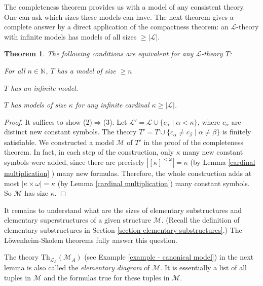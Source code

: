 \documentclass[a4paper, 11pt]{amsart}
\newtheorem{theorem}{Theorem}[subsection]
\theoremstyle{remark}
\newcommand{\NN}{\mathbb{N}}
\newcommand{\Th}{\mathrm{Th}}
\newcommand{\cL}{\mathcal L}
\newcommand{\cM}{\mathcal M}
\newenvironment{enumerate-(1)}{\begin{enumerate}[label={\upshape (\arabic*)}, leftmargin=2pc]}{\end{enumerate}}
\begin{document}
The completeness theorem provides us with a model of any consistent theory. 
One can ask which sizes these models can have. 
The next theorem gives a complete answer by a direct application of the compactness theorem: an $\cL$-theory with infinite models has models of all sizes ${\geq} |\cL|$. 

\begin{theorem} 
\label{models of any size from compactness} 
The following conditions are equivalent for any $\cL$-theory $T$: 
\begin{enumerate-(1)} 
\item 
For all $n\in\NN$, $T$ has a model of size ${\geq}n$ 
\item 
$T$ has an infinite model. 
\item 
$T$ has models of size $\kappa$ for any infinite cardinal $\kappa\geq |\cL|$. 
\end{enumerate-(1)} 
\end{theorem} 
\begin{proof} 
It suffices to show (2)$\Longrightarrow$(3). 
Let $\cL'=\cL\cup \{c_\alpha \mid \alpha<\kappa\}$, where $c_\alpha$ are distinct new constant symbols. 
The theory $T'=T\cup \{ c_\alpha \neq c_\beta \mid \alpha\neq \beta\}$ is finitely satisfiable. 
We constructed a model $\cM$ of $T'$ in the proof of the completeness theorem. 
In fact, in each step of the construction, only $\kappa$ many new constant symbols were added, since there are precisely $|[\kappa]^{{<}\omega}|=\kappa$ (by Lemma \ref{cardinal multiplication} ) many new formulas. 
Therefore, the whole construction adds at most $|\kappa\times \omega| = \kappa$ (by Lemma \ref{cardinal multiplication}) many constant symbols. 
So $\cM$ has size $\kappa$. 
\end{proof} 

It remains to understand what are the sizes of elementary substructures and elementary superstructures of a given structure $\cM$. 
(Recall the definition of elementary substructures in Section \ref{section elementary substructures}.) 
The L\"owenheim-Skolem theorems fully answer this question. 



The theory $\Th_{\cL_A}(\cM_A)$ (see Example \ref{example - canonical model}) in the next lemma is also called the \emph{elementary diagram} of $\cM$.  
It is essentially a list of all tuples in $\cM$ and the formulas true for these tuples in $\cM$. 
\end{document}
